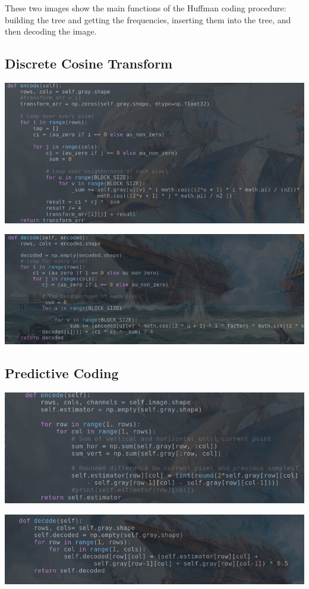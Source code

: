 \documentclass{article}
\begin{document}
These two images show the main functions of the Huffman coding procedure: building the 
tree and getting the frequencies, inserting them into the tree, and then decoding the 
image.

\subsection{Discrete Cosine Transform}
\includegraphics[scale=.50]{dct1.png}

\includegraphics[scale=.50]{dct2.png}
%
\subsection{Predictive Coding}
\includegraphics[scale=.60]{pred1.png}

\includegraphics[scale=.60]{pred2.png}
\end{document}
